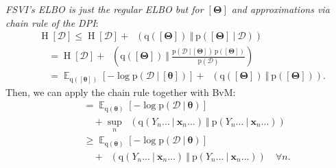 \documentclass[25pt,a0paper,landscape]{tikzposter}
\DeclareMathOperator{\opExpectation}{\mathbb{E}}
\newcommand{\E}[2]{\opExpectation_{#1} \left [ #2 \right ]}
\newcommand{\MidSymbol}[1][]{\:#1\:}
\newcommand{\given}{\MidSymbol[\vert]}
\DeclareMathOperator{\opEntropy}{H}
\newcommand{\Hof}[1]{\opEntropy[#1]}
\DeclareMathOperator{\opKale}{D_\mathrm{KL}}
\newcommand{\Kale}[2]{\opKale(#1 \MidSymbol[\Vert] #2)}
\newcommand{\opp}{\mathrm{p}}
\newcommand{\pof}[1]{\opp(#1)}
\newcommand{\opq}{\mathrm{q}}
\newcommand{\qof}[1]{\opq(#1)}
\newcommand{\w}{\boldsymbol{\theta}}
\newcommand{\W}{\boldsymbol{\Theta}}
\newcommand{\Dany}{\mathcal{D}}
\newcommand{\Y}{Y}
\newcommand{\x}{\boldsymbol{x}}
\begin{document}
\begin{columns}
{\begin{multicols}{2}
\begin{theorybox}[title=Bernstein von Mises' Theorem]
    \end{theorybox}
    \begin{proofbox}[title=Function-Space Variational Inference \& ELBO]
      \emph{FSVI's ELBO is just the regular ELBO but for $[\W]$ and approximations via chain rule of the DPI}:
      \begin{align*}
        &\Hof{\Dany} \le \Hof{\Dany} + \Kale{\qof{[\W]}}{\pof{[\W] \given \Dany}} \\
        &\quad = \Hof{\Dany} + \Kale{\qof{[\W]}}{\frac{\pof{\Dany \given [\W]} \, \pof{[\W]}}{\pof{\Dany}}} \\
        &\quad = 
        \E{\qof{[\w]}}{-\log \pof{\Dany \given [\w]}} + \Kale{\qof{[\W]}}{\pof{[\W]}}.
      \end{align*}
      Then, we can apply the chain rule together with BvM:
      \begin{align*}
        &\quad = \E{\qof{\w}}{-\log \pof{\Dany \given \w}} \\
        &\quad \quad + \sup_n \Kale{\qof{\Y_n... \given \x_n...}}{\pof{\Y_n... \given \x_n...}} \\
        &\quad \ge \E{\qof{\w}}{-\log \pof{\Dany \given \w}} \\
        &\quad \quad + \Kale{\qof{\Y_n... \given \x_n...}}{\pof{\Y_n... \given \x_n...}} \quad \forall n.
      \end{align*}
    \end{proofbox}
    \end{multicols}
}
\end{columns}
\end{document}
